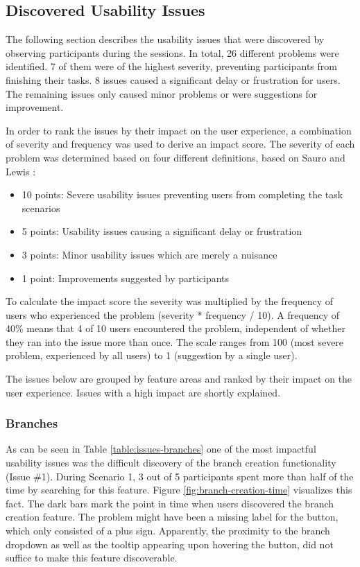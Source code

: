 \subsection{Discovered Usability Issues} \label{sec:usability-issues-1st-study}
The following section describes the usability issues that were discovered by observing participants during the sessions. In total, 26 different problems were identified. 7 of them were of the highest severity, preventing participants from finishing their tasks. 8 issues caused a significant delay or frustration for users. The remaining issues only caused minor problems or were suggestions for improvement.

In order to rank the issues by their impact on the user experience, a combination of severity and frequency was used to derive an impact score. The severity of each problem was determined based on four different definitions, based on Sauro and Lewis \cite[p.14]{sauro_quantifying_2012}:

\begin{itemize}
\item 10 points: Severe usability issues preventing users from completing the task scenarios
\item 5 points: Usability issues causing a significant delay or frustration
\item 3 points: Minor usability issues which are merely a nuisance
\item 1 point: Improvements suggested by participants
\end{itemize}

To calculate the impact score the severity was multiplied by the frequency of users who experienced the problem (severity * frequency / 10). A frequency of 40\% means that 4 of 10 users encountered the problem, independent of whether they ran into the issue more than once. The scale ranges from 100 (most severe problem, experienced by all users) to 1 (suggestion by a single user).

The issues below are grouped by feature areas and ranked by their impact on the user experience. Issues with a high impact are shortly explained.

\subsubsection{Branches}
As can be seen in Table \ref{table:issues-branches} one of the most impactful usability issues was the difficult discovery of the branch creation functionality (Issue \#1). During Scenario 1, 3 out of 5 participants spent more than half of the time by searching for this feature. Figure \ref{fig:branch-creation-time} visualizes this fact. The dark bars mark the point in time when users discovered the branch creation feature. The problem might have been a missing label for the button, which only consisted of a plus sign. Apparently, the proximity to the branch dropdown as well as the tooltip appearing upon hovering the button, did not suffice to make this feature discoverable.

